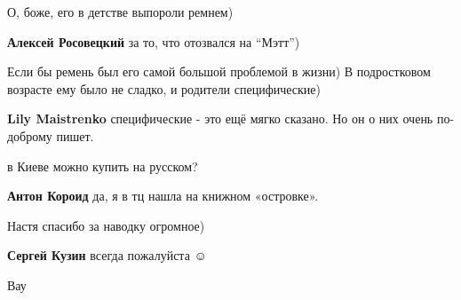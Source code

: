  
 
 
 
 
\zzSecCmt

\begin{itemize} %
О, боже, его в детстве выпороли ремнем)

\textbf{Алексей Росовецкий} за то, что отозвался на \enquote{Мэтт})

Если бы ремень был его самой большой проблемой в жизни)
В подростковом возрасте ему было не сладко, и родители специфические)

\textbf{Lily Maistrenko} специфические - это ещё мягко сказано. Но он о них очень по-доброму пишет.

в Киеве можно купить на русском?

\textbf{Антон Короид} да, я в тц нашла на книжном «островке».

Настя спасибо за наводку огромное)

\textbf{Сергей Кузин} всегда пожалуйста  ☺ ️ 

Вау
\end{itemize} %
